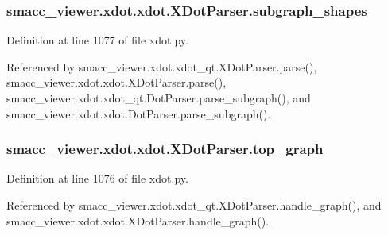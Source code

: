 \subsubsection[{\texorpdfstring{subgraph\+\_\+shapes}{subgraph_shapes}}]{\setlength{\rightskip}{0pt plus 5cm}smacc\+\_\+viewer.\+xdot.\+xdot.\+X\+Dot\+Parser.\+subgraph\+\_\+shapes}\hypertarget{classsmacc__viewer_1_1xdot_1_1xdot_1_1XDotParser_aa2c8b09ed8274e0eeb753b28deb1c770}{}\label{classsmacc__viewer_1_1xdot_1_1xdot_1_1XDotParser_aa2c8b09ed8274e0eeb753b28deb1c770}


Definition at line 1077 of file xdot.\+py.



Referenced by smacc\+\_\+viewer.\+xdot.\+xdot\+\_\+qt.\+X\+Dot\+Parser.\+parse(), smacc\+\_\+viewer.\+xdot.\+xdot.\+X\+Dot\+Parser.\+parse(), smacc\+\_\+viewer.\+xdot.\+xdot\+\_\+qt.\+Dot\+Parser.\+parse\+\_\+subgraph(), and smacc\+\_\+viewer.\+xdot.\+xdot.\+Dot\+Parser.\+parse\+\_\+subgraph().

\subsubsection[{\texorpdfstring{top\+\_\+graph}{top_graph}}]{\setlength{\rightskip}{0pt plus 5cm}smacc\+\_\+viewer.\+xdot.\+xdot.\+X\+Dot\+Parser.\+top\+\_\+graph}\hypertarget{classsmacc__viewer_1_1xdot_1_1xdot_1_1XDotParser_a5c873e467edfbfa937d8a59a8e1853c2}{}\label{classsmacc__viewer_1_1xdot_1_1xdot_1_1XDotParser_a5c873e467edfbfa937d8a59a8e1853c2}


Definition at line 1076 of file xdot.\+py.



Referenced by smacc\+\_\+viewer.\+xdot.\+xdot\+\_\+qt.\+X\+Dot\+Parser.\+handle\+\_\+graph(), and smacc\+\_\+viewer.\+xdot.\+xdot.\+X\+Dot\+Parser.\+handle\+\_\+graph().

